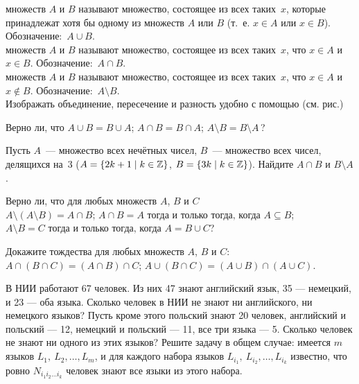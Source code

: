 \documentclass[a4paper,12pt]{article}
\begin{document}
 множеств $A$ и $B$ называют множество,
состоящее из всех таких~$x$, которые принадлежат хотя бы одному
из множеств $A$ или $B$ (т.~е. $x\in A$ или $x\in B$).
Обозначение:~\hbox{$A\cup B$}.\\
 множеств $A$ и $B$ называют множество,
состоящее из всех таких~$x$, что $x\in A$ и $x\in B$.
Обозначение:~$A\cap B$.\\
 множеств $A$ и $B$ называют множество,
состоящее из всех таких~$x$, что $x\in A$ и $x\notin B$.
Обозначение:~$A\setminus B$.\\
Изображать объединение, пересечение и разность
удобно с помощью  (см. рис.)



Верно ли, что
 $A\cup B = B \cup A$;
 $A\cap B = B \cap A$;
 $A\setminus B = B \setminus A$\,?

Пусть $A$~--- множество всех нечётных чисел,
$B$~--- множество всех чисел, делящихся на~3 ($A=\{2k+1 \mid k\in\mathbb{Z}\}$, $B=\{3k \mid k\in\mathbb{Z}\}$). Найдите $A\cap B$ и $B\setminus A$.



Верно ли, что для любых множеств $A$, $B$ и $C$\\
 $A\setminus(A\setminus B) = A\cap B$;
 $A\cap B = A \mbox{ тогда и только тогда, когда } A\subseteq B$; \\
 $A\setminus B = C \mbox{ тогда и только тогда, когда } A=B\cup C$?


Докажите тождества для любых множеств $A$, $B$ и $C$:\\
 $A\cap(B\cap C) = (A\cap B)\cap C$;
 $A\cup(B\cap C) = (A\cup B)\cap(A\cup C)$.



 В НИИ работают 67 человек. Из них
47 знают английский язык, 35 --- немецкий, и 23 --- оба языка.
Сколько человек в НИИ
не знают ни английского, ни немецкого языков?
 Пусть кроме этого  польский
знают 20 человек, английский и польский --- 12, немецкий и
польский --- 11, все три языка --- 5.
Сколько человек не знают ни одного из этих языков?
Решите задачу в общем случае: имеется $m$ языков $L_1,\ L_2,\ldots,L_m$,
и для каждого набора языков $L_{i_1},\ L_{i_2},\ldots,L_{i_k}$ известно, что ровно $N_{i_1i_2\ldots i_k}$ человек знают все языки из этого набора.
\end{document}

